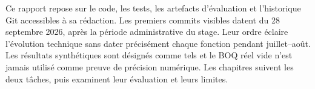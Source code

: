 Ce rapport repose sur le code, les tests, les artefacts d'évaluation et l'historique Git accessibles à sa rédaction. Les premiers commits visibles datent du 28 septembre 2026, après la période administrative du stage. Leur ordre éclaire l'évolution technique sans dater précisément chaque fonction pendant juillet--août. Les résultats synthétiques sont désignés comme tels et le BOQ réel vide n'est jamais utilisé comme preuve de précision numérique. Les chapitres suivent les deux tâches, puis examinent leur évaluation et leurs limites.
